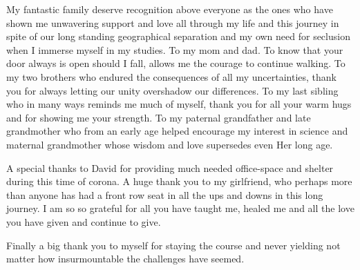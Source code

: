 My fantastic family deserve recognition above everyone as the ones who have shown me unwavering support and love all
through my life and this journey in spite of our long standing geographical separation and my own need for seclusion
when I immerse myself in my studies. To my mom and dad. To know that your door always is open should I fall, allows me
the courage to continue walking. To my two brothers who endured the consequences of all my uncertainties, thank you for
always letting our unity overshadow our differences. To my last sibling who in many ways reminds me much of myself,
thank you for all your warm hugs and for showing me your strength. To my paternal grandfather and late grandmother
who from an early age helped encourage my interest in science and maternal grandmother whose wisdom and love supersedes even
Her long age.

A special thanks to David for providing much needed office-space and shelter during this time of corona.
A huge thank you to my girlfriend, who perhaps more than anyone has had a front row seat in all the ups and downs
in this long journey. I am so so grateful for all you have taught me, healed me and all the love you have given and continue to give.

Finally a big thank you to myself for staying the course and never yielding not matter how insurmountable the challenges
have seemed.
